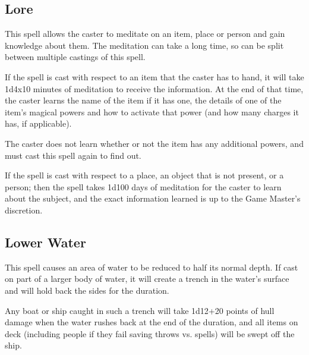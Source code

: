 \begin{multicols*}{2}
\subsection{Lore}\label{spell:Lore}

This spell allows the caster to meditate on an item, place or person and gain knowledge about them. The meditation can take a long time, so can be split between multiple castings of this spell.

If the spell is cast with respect to an item that the caster has to hand, it will take 1d4x10 minutes of meditation to receive the information. At the end of that time, the caster learns the name of the item if it has one, the details of one of the item’s magical powers and how to activate that power (and how many charges it has, if applicable).

The caster does not learn whether or not the item has any additional powers, and must cast this spell again to find out.

If the spell is cast with respect to a place, an object that is not present, or a person; then the spell takes 1d100 days of meditation for the caster to learn about the subject, and the exact information learned is up to the Game Master’s discretion.

\subsection{Lower Water}\label{spell:Lower Water}

This spell causes an area of water to be reduced to half its normal depth. If cast on part of a larger body of water, it will create a trench in the water’s surface and will hold back the sides for the duration.

Any boat or ship caught in such a trench will take 1d12+20 points of hull damage when the water rushes back at the end of the duration, and all items on deck (including people if they fail saving throws vs. spells) will be swept off the ship.


\end{multicols*}
